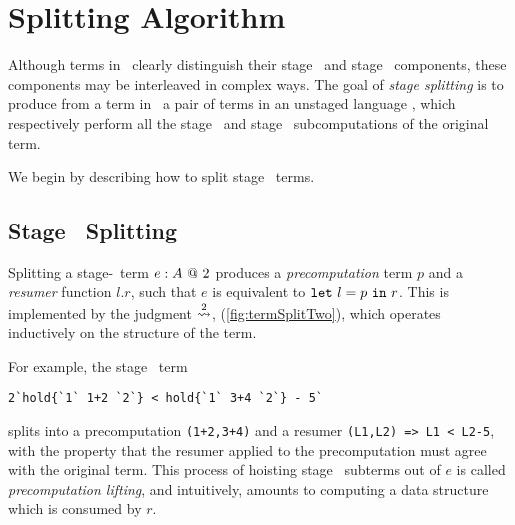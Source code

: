 
\section{Splitting Algorithm}
\label{sec:splitting}


Although terms in \lang\ clearly distinguish their stage \bbone\ and stage
\bbtwo\ components, these components may be interleaved in complex ways. The
goal of \emph{stage splitting} is to produce from a term in \lang\ a pair of
terms in an unstaged language \langmono, which respectively perform all the
stage \bbone\ and stage \bbtwo\ subcomputations of the original term.

We begin by describing how to split stage \bbtwo\ terms.


\subsection {Stage \bbtwo\ Splitting}

Splitting a stage-\bbtwo\ term ${e}:{A}~@~ 2$ produces a \emph{precomputation}
term $p$ and a \emph{resumer} function $l.r$, such that $e$ is equivalent to
${\tt let}~{l} = {p}~{\tt in}~{r}$. This is implemented by the judgment $\overset{ 2}\rightsquigarrow$,
(\cref{fig:termSplitTwo}), which operates inductively on the structure of the
term.

For example, the stage \bbtwo\ term
\begin{lstlisting}
2`hold{`1` 1+2 `2`} < hold{`1` 3+4 `2`} - 5`
\end{lstlisting}
splits into a precomputation \verb|(1+2,3+4)| and a resumer
\verb|(L1,L2) => L1 < L2-5|, with the property that the resumer applied to the
precomputation must agree with the original term. This process of hoisting stage
\bbone\ subterms out of $e$ is called \emph{precomputation lifting}, and
intuitively, amounts to computing a data structure which is consumed by $r$.

